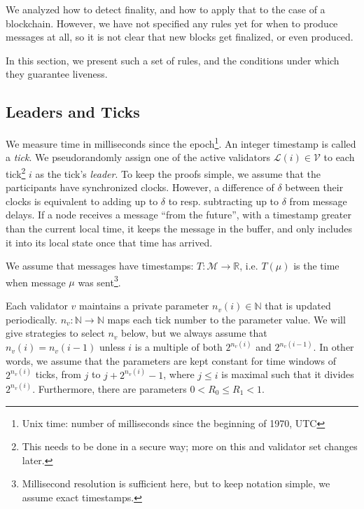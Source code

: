\documentclass[12pt, fleqn]{article}
\begin{document}
We analyzed how to detect finality, and how to apply that to the case of a blockchain. However, we have not specified any rules yet for when to produce messages at all, so it is not clear that new blocks get finalized, or even produced.

In this section, we present such a set of rules, and the conditions under which they guarantee liveness.


\subsection{Leaders and Ticks}

We measure time in milliseconds since the epoch\footnote{Unix time: number of milliseconds since the beginning of 1970, UTC}. An integer timestamp is called a \emph{tick}. We pseudorandomly assign one of the active validators $\mathcal{L}(i) \in \mathcal{V}$ to each tick\footnote{This needs to be done in a secure way; more on this and validator set changes later.} $i$ as the tick's \emph{leader}. To keep the proofs simple, we assume that the participants have synchronized clocks. However, a difference of $\delta$ between their clocks is equivalent to adding up to $\delta$ to resp. subtracting up to $\delta$ from message delays. If a node receives a message ``from the future'', with a timestamp greater than the current local time, it keeps the message in the buffer, and only includes it into its local state once that time has arrived.

We assume that messages have timestamps: $T: \mathcal{M} \rightarrow \mathbb{R}$, i.e. $T(\mu)$ is the time when message $\mu$ was sent\footnote{Millisecond resolution is sufficient here, but to keep notation simple, we assume exact timestamps.}.

Each validator $v$ maintains a private parameter $n_v(i) \in \mathbb{N}$ that is updated periodically. $n_v: \mathbb{N} \rightarrow \mathbb{N}$ maps each tick number to the parameter value. We will give strategies to select $n_v$ below, but we always assume that $n_v (i) = n_v (i - 1)$ unless $i$ is a multiple of both $2^{n_v(i)}$ and $2^{n_v(i-1)}$. In other words, we assume that the parameters are kept constant for time windows of $2^{n_v(i)}$ ticks, from $j$ to $j + 2^{n_v(i)} - 1$, where $j \leq i$ is maximal such that it divides $2^{n_v(i)}$. Furthermore, there are parameters $0 < R_0 \leq R_1 < 1$.
\end{document}

